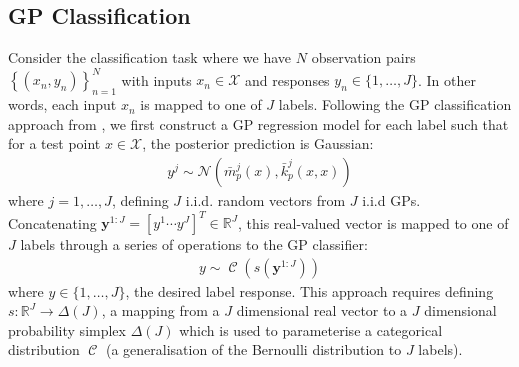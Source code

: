 \documentclass{article}
\newcommand{\Cat}{\operatorname{\mathcal{C}}}
\numberwithin{equation}{section}
\begin{document}
\subsection{GP Classification}
Consider the classification task where we have $N$ observation pairs $\left\{(x_n, y_n)\right\}_{n=1}^{N}$ with inputs $x_n \in \mathcal{X}$ and responses $y_n \in \{1, \dots, J\}$. In other words, each input $x_n$ is mapped to one of $J$ labels. Following the GP classification approach from \cite{matthews2017scalable}, we first construct a GP regression model for each label such that for a test point $x \in \mathcal{X}$, the posterior prediction is Gaussian:
\begin{align}
    y^j \sim \mathcal{N}\left(\bar{m}_p^j(x), \bar{k}_p^j(x, x)\right)
    \label{gp-classifier-regressors}
\end{align}
where $j=1, \dots, J$, defining $J$ i.i.d. random vectors from $J$ i.i.d GPs.
Concatenating $\mathbf{y}^{1:J} = [y^1 \cdots y^J]^T \in \mathbb{R}^{J}$, this real-valued vector is mapped to one of $J$ labels through a series of operations to the GP classifier:
\begin{align}
y \sim \Cat \left(s\left(\mathbf{y}^{1:J}\right)\right)
\label{gp-classifier}
\end{align}
where $y \in \{1, \dots, J\}$, the desired label response. This approach requires defining $s: \mathbb{R}^J \rightarrow \Delta(J)$, a mapping from a $J$ dimensional real vector to a $J$ dimensional probability simplex $\Delta(J)$ which is used to parameterise a categorical distribution $\Cat$ (a generalisation of the Bernoulli distribution to $J$ labels).
\end{document}
